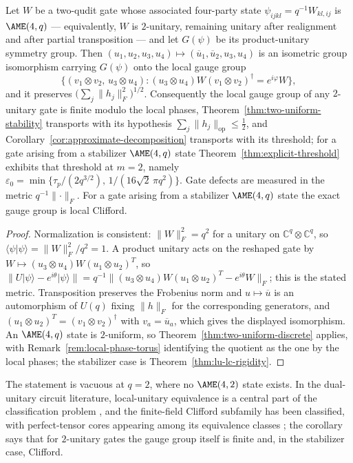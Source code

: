 \begin{corollary}
\label{cor:two-unitary-gauge}
Let \(W\) be a two-qudit gate whose associated four-party state
\(\psi_{ijkl}=q^{-1}W_{kl,ij}\) is \(\AME(4,q)\) --- equivalently, \(W\) is
\(2\)-unitary, remaining unitary after realignment and after partial
transposition --- and let \(G(\psi)\) be its product-unitary symmetry
group.  Then
\((u_1,u_2,u_3,u_4)\mapsto(\overline u_1,\overline u_2,u_3,u_4)\) is an
isometric group isomorphism carrying \(G(\psi)\) onto the local gauge
group
\[
 \{(v_1\otimes v_2,\,u_3\otimes u_4):
   (u_3\otimes u_4)W(v_1\otimes v_2)^\dagger=e^{i\varphi}W\},
\]
and it preserves \(\bigl(\sum_j\lVert h_j\rVert_F^2\bigr)^{1/2}\).
Consequently the local gauge group of any \(2\)-unitary gate is finite
modulo the local phases, Theorem~\ref{thm:two-uniform-stability} transports
with its hypothesis \(\sum_j\lVert h_j\rVert_{\mathrm{op}}\leq\frac12\),
and Corollary~\ref{cor:approximate-decomposition} transports with its
threshold; for a gate arising from a stabilizer \(\AME(4,q)\) state
Theorem~\ref{thm:explicit-threshold} exhibits that threshold at \(m=2\),
namely \(\varepsilon_0=\min\{\tau_p/(2q^{3/2}),\,
1/(16\sqrt2\,\pi q^2)\}\).  Gate defects
are measured in the metric \(q^{-1}\lVert\cdot\rVert_F\).  For a gate
arising from a stabilizer \(\AME(4,q)\) state the exact gauge group is
local Clifford.
\end{corollary}

\begin{proof}
Normalization is consistent: \(\lVert W\rVert_F^2=q^2\) for a unitary on
\(\mathbb C^q\otimes\mathbb C^q\), so
\(\langle\psi\vert\psi\rangle=\lVert W\rVert_F^2/q^2=1\).  A product
unitary acts on the reshaped gate by
\(W\mapsto(u_3\otimes u_4)W(u_1\otimes u_2)^{T}\), so
\(\lVert U\lvert\psi\rangle-e^{i\theta}\lvert\psi\rangle\rVert
 =q^{-1}\lVert(u_3\otimes u_4)W(u_1\otimes u_2)^T-e^{i\theta}W\rVert_F\);
this is the stated metric.  Transposition preserves the Frobenius norm and
\(u\mapsto\overline u\) is an automorphism of \(U(q)\) fixing
\(\lVert h\rVert_F\) for the corresponding generators, and
\((u_1\otimes u_2)^T=(v_1\otimes v_2)^\dagger\) with
\(v_a=\overline u_a\), which gives the displayed isomorphism.  An
\(\AME(4,q)\) state is \(2\)-uniform, so
Theorem~\ref{thm:two-uniform-discrete} applies, with
Remark~\ref{rem:local-phase-torus} identifying the quotient as the one by
the local phases; the stabilizer case is
Theorem~\ref{thm:lu-lc-rigidity}.
\end{proof}

The statement is vacuous at \(q=2\), where no \(\AME(4,2)\) state exists.
In the dual-unitary circuit literature, local-unitary equivalence is a
central part of the classification problem
\cite{RatherAravindaLakshminarayan2022}, and the finite-field Clifford
subfamily has been classified, with perfect-tensor cores appearing among
its equivalence classes \cite{Pahari2026}; the corollary says that for
\(2\)-unitary gates the gauge group itself is finite and, in the stabilizer
case, Clifford.
